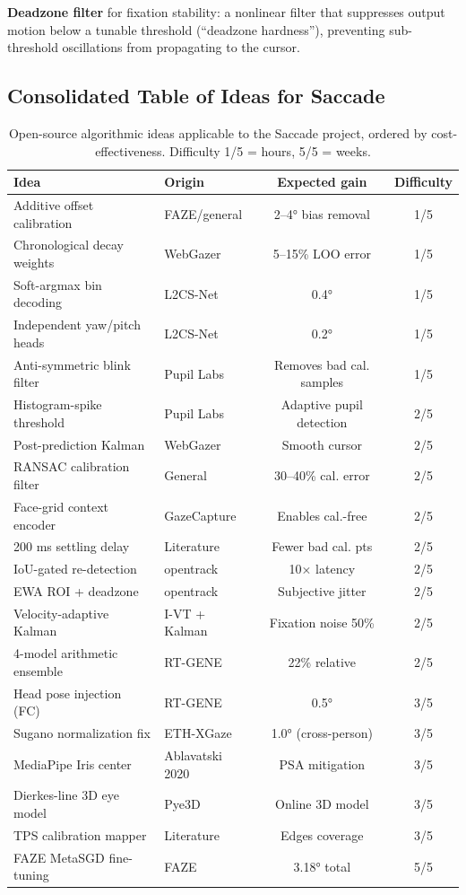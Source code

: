 \documentclass[11pt,a4paper]{article}
\begin{document}
\textbf{Deadzone filter} for fixation stability:
a nonlinear filter that suppresses output motion below a tunable threshold
(``deadzone hardness''), preventing sub-threshold oscillations from propagating to the cursor.

\subsection{Consolidated Table of Ideas for Saccade}

\begin{table}[H]
\centering
\caption{Open-source algorithmic ideas applicable to the Saccade project,
ordered by cost-effectiveness.
Difficulty 1/5 = hours, 5/5 = weeks.}
\label{tab:ideas}
\small
\begin{tabular}{p{4.5cm}lcc}
\hline
\textbf{Idea} & \textbf{Origin} & \textbf{Expected gain} & \textbf{Difficulty} \\
\hline
Additive offset calibration & FAZE/general & 2--4° bias removal & 1/5 \\
Chronological decay weights & WebGazer & 5--15\% LOO error & 1/5 \\
Soft-argmax bin decoding & L2CS-Net & 0.4° & 1/5 \\
Independent yaw/pitch heads & L2CS-Net & 0.2° & 1/5 \\
Anti-symmetric blink filter & Pupil Labs & Removes bad cal. samples & 1/5 \\
Histogram-spike threshold & Pupil Labs & Adaptive pupil detection & 2/5 \\
Post-prediction Kalman & WebGazer & Smooth cursor & 2/5 \\
RANSAC calibration filter & General & 30--40\% cal. error & 2/5 \\
Face-grid context encoder & GazeCapture & Enables cal.-free & 2/5 \\
200 ms settling delay & Literature & Fewer bad cal. pts & 2/5 \\
IoU-gated re-detection & opentrack & 10× latency & 2/5 \\
EWA ROI + deadzone & opentrack & Subjective jitter & 2/5 \\
Velocity-adaptive Kalman & I-VT + Kalman & Fixation noise 50\% & 2/5 \\
4-model arithmetic ensemble & RT-GENE & 22\% relative & 2/5 \\
Head pose injection (FC) & RT-GENE & 0.5° & 3/5 \\
Sugano normalization fix & ETH-XGaze & 1.0° (cross-person) & 3/5 \\
MediaPipe Iris center & Ablavatski 2020 & PSA mitigation & 3/5 \\
Dierkes-line 3D eye model & Pye3D & Online 3D model & 3/5 \\
TPS calibration mapper & Literature & Edges coverage & 3/5 \\
FAZE MetaSGD fine-tuning & FAZE & 3.18° total & 5/5 \\
\hline
\end{tabular}
\end{table}
\end{document}
